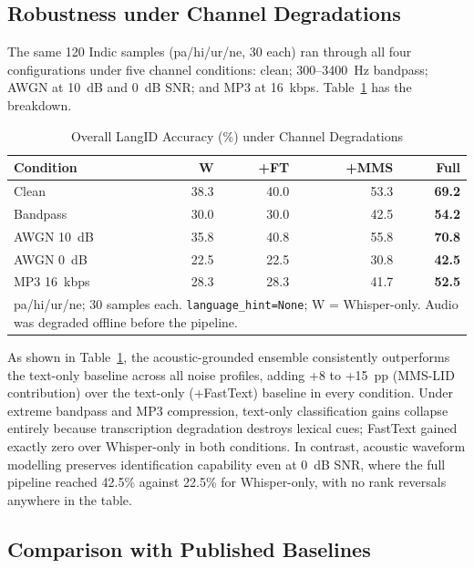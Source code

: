\documentclass[conference]{IEEEtran}
\begin{document}
\subsection{Robustness under Channel Degradations}
\label{sec:robustness}

The same 120 Indic samples (pa/hi/ur/ne, 30 each) ran through all four configurations under five channel conditions: clean; 300--3400~Hz bandpass; AWGN at 10~dB and 0~dB SNR; and MP3 at 16~kbps. Table~\ref{tab:robustness} has the breakdown.

\begin{table}[htbp]
\caption{Overall LangID Accuracy (\%) under Channel Degradations}
\label{tab:robustness}
\begin{center}
\begin{tabular}{lrrrr}
\toprule
\textbf{Condition} & \textbf{W} & \textbf{+FT} & \textbf{+MMS} & \textbf{Full} \\
\midrule
Clean          & 38.3 & 40.0 & 53.3 & \textbf{69.2} \\
Bandpass       & 30.0 & 30.0 & 42.5 & \textbf{54.2} \\
AWGN 10~dB     & 35.8 & 40.8 & 55.8 & \textbf{70.8} \\
AWGN 0~dB      & 22.5 & 22.5 & 30.8 & \textbf{42.5} \\
MP3 16~kbps    & 28.3 & 28.3 & 41.7 & \textbf{52.5} \\
\midrule
\multicolumn{5}{p{8cm}}{\footnotesize pa/hi/ur/ne; 30 samples each. \texttt{language\_hint=None}; W = Whisper-only. Audio was degraded offline before the pipeline.} \\
\bottomrule
\end{tabular}
\end{center}
\end{table}

As shown in Table~\ref{tab:robustness}, the acoustic-grounded ensemble consistently outperforms the text-only baseline across all noise profiles, adding +8 to +15~pp (MMS-LID contribution) over the text-only (+FastText) baseline in every condition. Under extreme bandpass and MP3 compression, text-only classification gains collapse entirely because transcription degradation destroys lexical cues; FastText gained exactly zero over Whisper-only in both conditions. In contrast, acoustic waveform modelling preserves identification capability even at 0~dB SNR, where the full pipeline reached 42.5\% against 22.5\% for Whisper-only, with no rank reversals anywhere in the table.

\subsection{Comparison with Published Baselines}
\end{document}
